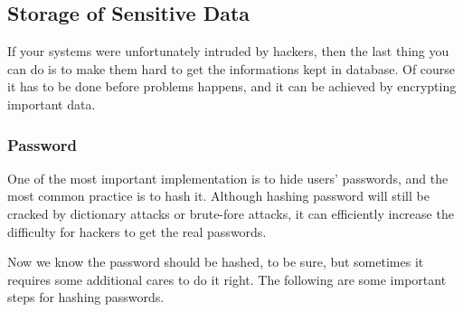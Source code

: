 \documentclass[conference]{IEEEtran}
\begin{document}
\subsection{Storage of Sensitive Data}
If your systems were unfortunately intruded by hackers,
then the last thing you can do is to make them hard to get the informations
kept in database.
Of course it has to be done before problems happens,
and it can be achieved by
encrypting important data.

\subsubsection{Password}
One of the most important implementation is to hide
users' passwords, and the most common practice is to hash it.
Although hashing password will still be cracked by
dictionary attacks or brute-fore attacks,
it can efficiently increase the difficulty for hackers to
get the real passwords.

Now we know the password should be hashed, to be sure, but sometimes
it requires some additional cares to do it right. The following are
some important steps for hashing passwords.
\end{document}

